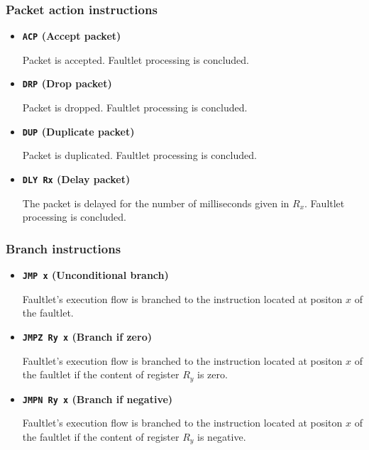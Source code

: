 \documentclass[11pt]{article}
\begin{document}
\subsubsection{Packet action instructions}

\begin{itemize}

\item \textbf{\texttt{ACP} (Accept packet)} 

Packet is accepted. Faultlet processing is concluded.

\item \textbf{\texttt{DRP} (Drop packet)} 

Packet is dropped. Faultlet processing is concluded.

\item \textbf{\texttt{DUP} (Duplicate packet)} 

Packet is duplicated. Faultlet processing is concluded.

\item \textbf{\texttt{DLY Rx} (Delay packet)}

The packet is delayed for the number of milliseconds given in $R_x$. Faultlet processing is concluded.

\end{itemize}

\subsubsection{Branch instructions}

\begin{itemize}

\item \textbf{\texttt{JMP x} (Unconditional branch)}

Faultlet's execution flow is branched to the instruction located at positon $x$ of the faultlet. 

\item \textbf{\texttt{JMPZ Ry x} (Branch if zero)} 

Faultlet's execution flow is branched to the instruction located at positon $x$ of the faultlet if the content of register $R_y$ is zero. 

\item \textbf{\texttt{JMPN Ry x} (Branch if negative)} 

Faultlet's execution flow is branched to the instruction located at positon $x$ of the faultlet if the content of register $R_y$ is negative. 

\end{itemize}
\end{document}
